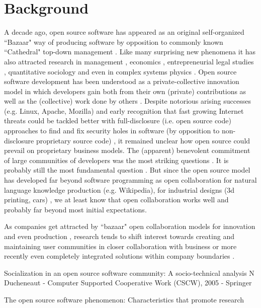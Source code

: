 \section{Background}
A decade ago, open source software has appeared as an original self-organized ``Bazaar" way of producing software by opposition to commonly known ``Cathedral" top-down management \cite{raymond1999}. Like many surprising new phenomena it has also attracted research in management \cite{vonkrogh2006pro}, economics \cite{lerner2002}, entrepreneurial legal studies \cite{benkler2002},  quantitative sociology \cite{} and even in complex systems physics \cite{}. Open source software development has been understood as a private-collective 
innovation model in which developers gain both from their own (private) contributions as well as the (collective) work done by others \cite{vonhippel2003oss}. Despite notorious arising successes (e.g. Linux, Apache, Mozilla) and early recognition that fast growing Internet threats could be tackled better with full-disclosure (i.e. open source code) approaches to find and fix security holes in software (by opposition to non-disclosure  proprietary source code) \cite{}, it remained unclear how open source could prevail on proprietary business models.  The (apparent) benevolent commitment of large communities of developers was the most striking questions \cite{}. It is probably still the most fundamental question \cite{benkler2011leviathan}. But since the open source model has developed far beyond software programming as open collaboration for natural language knowledge production (e.g. Wikipedia), for industrial designs (3d printing, cars) \cite{raasch2009,pearce2012}, we at least know that open collaboration works well and probably far beyond most initial expectations. 

As companies get attracted by  ``bazaar" open collaboration models for innovation and even production \cite{}, research tends to shift interest towards creating and maintaining user communities \cite{ vonHippel2001} in closer collaboration with business  \cite{bonaccorsi2004ais} or more recently even completely integrated solutions within company boundaries \cite{}.

Socialization in an open source software community: A socio-technical analysis
N Ducheneaut - Computer Supported Cooperative Work (CSCW), 2005 - Springer




\cite{vonHippel2005Democratizing,}

The open source software phenomenon: Characteristics that promote research \cite{ vonkrogh2007}
  	


